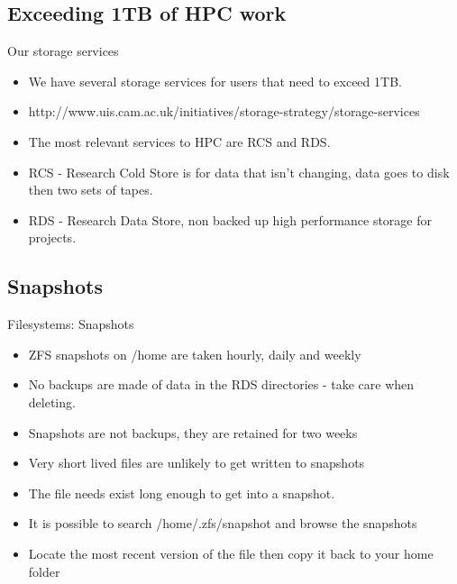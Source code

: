 \subsection{Exceeding 1TB of HPC work}
\begin{frame}{Our storage services}
\begin{itemize}
\item{We have several storage services for users that need to exceed 1TB.}
\pause
\item{\alert{http://www.uis.cam.ac.uk/initiatives/storage-strategy/storage-services}}
\item{The most relevant services to HPC are RCS and RDS.}
\item{RCS - Research Cold Store is for data that isn't changing, data goes to disk then two sets of tapes.}
\item{RDS - Research Data Store, non backed up high performance storage for projects.}
\end{itemize}
\end{frame}

\subsection{Snapshots}
\begin{frame}{Filesystems: Snapshots}
\begin{itemize}
\item<1->{ZFS snapshots on /home are taken hourly, daily and weekly}
\item<2->{{\color{red}No backups are made of data in the RDS directories - take care when deleting.}}
\item<3->{Snapshots are not backups, they are retained for two weeks}
\item<4->{\color{red}Very short lived files are unlikely to get written to snapshots}
\item{The file needs exist long enough to get into a snapshot.}
\item{It is possible to search /home/.zfs/snapshot and browse the snapshots}
\item {Locate the most recent version of the file then copy it back to your home folder} 
\end{itemize}
\end{frame}

